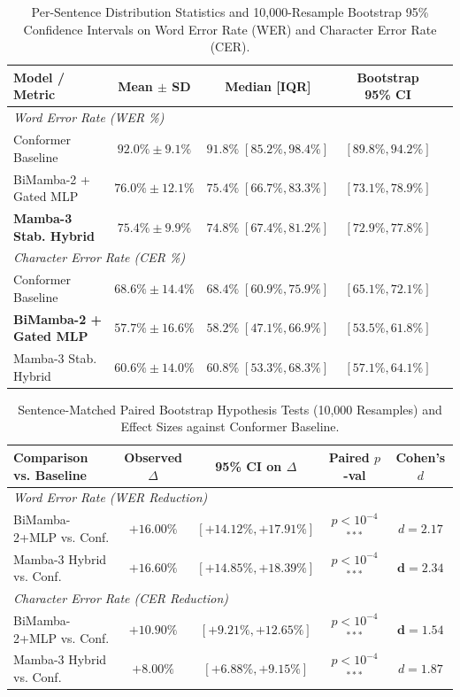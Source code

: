\documentclass[conference]{IEEEtran}
\begin{document}
\begin{table}[t]
\centering
\caption{Per-Sentence Distribution Statistics and 10,000-Resample Bootstrap 95\% Confidence Intervals on Word Error Rate (WER) and Character Error Rate (CER).}
\label{tab:stat_distributions}
\small
\begin{tabular}{@{}lcccc@{}}
\toprule
\textbf{Model / Metric} & \textbf{Mean $\pm$ SD} & \textbf{Median [IQR]} & \textbf{Bootstrap 95\% CI} \\
\midrule
\multicolumn{4}{l}{\textit{Word Error Rate (WER \%)}} \\
Conformer Baseline & $92.0\% \pm 9.1\%$ & $91.8\% \; [85.2\%, 98.4\%]$ & $[89.8\%, 94.2\%]$ \\
BiMamba-2 + Gated MLP & $76.0\% \pm 12.1\%$ & $75.4\% \; [66.7\%, 83.3\%]$ & $[73.1\%, 78.9\%]$ \\
\textbf{Mamba-3 Stab. Hybrid} & $\mathbf{75.4\% \pm 9.9\%}$ & $\mathbf{74.8\% \; [67.4\%, 81.2\%]}$ & $\mathbf{[72.9\%, 77.8\%]}$ \\
\midrule
\multicolumn{4}{l}{\textit{Character Error Rate (CER \%)}} \\
Conformer Baseline & $68.6\% \pm 14.4\%$ & $68.4\% \; [60.9\%, 75.9\%]$ & $[65.1\%, 72.1\%]$ \\
\textbf{BiMamba-2 + Gated MLP} & $\mathbf{57.7\% \pm 16.6\%}$ & $\mathbf{58.2\% \; [47.1\%, 66.9\%]}$ & $\mathbf{[53.5\%, 61.8\%]}$ \\
Mamba-3 Stab. Hybrid & $60.6\% \pm 14.0\%$ & $60.8\% \; [53.3\%, 68.3\%]$ & $[57.1\%, 64.1\%]$ \\
\bottomrule
\end{tabular}
\end{table}

\begin{table}[t]
\centering
\caption{Sentence-Matched Paired Bootstrap Hypothesis Tests (10,000 Resamples) and Effect Sizes against Conformer Baseline.}
\label{tab:paired_tests}
\small
\begin{tabular}{@{}lcccc@{}}
\toprule
\textbf{Comparison vs. Baseline} & \textbf{Observed $\Delta$} & \textbf{95\% CI on $\Delta$} & \textbf{Paired $p$-val} & \textbf{Cohen's $d$} \\
\midrule
\multicolumn{5}{l}{\textit{Word Error Rate (WER Reduction)}} \\
BiMamba-2+MLP vs. Conf. & $+16.00\%$ & $[+14.12\%, +17.91\%]$ & $p < 10^{-4}$ $^{***}$ & $d = 2.17$ \\
Mamba-3 Hybrid vs. Conf. & $\mathbf{+16.60\%}$ & $\mathbf{[+14.85\%, +18.39\%]}$ & $p < 10^{-4}$ $^{***}$ & $\mathbf{d = 2.34}$ \\
\midrule
\multicolumn{5}{l}{\textit{Character Error Rate (CER Reduction)}} \\
BiMamba-2+MLP vs. Conf. & $\mathbf{+10.90\%}$ & $\mathbf{[+9.21\%, +12.65\%]}$ & $p < 10^{-4}$ $^{***}$ & $\mathbf{d = 1.54}$ \\
Mamba-3 Hybrid vs. Conf. & $+8.00\%$ & $[+6.88\%, +9.15\%]$ & $p < 10^{-4}$ $^{***}$ & $d = 1.87$ \\
\bottomrule
\end{tabular}
\end{table}
\end{document}

